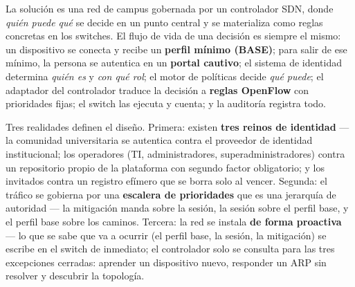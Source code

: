\documentclass[11pt,a4paper]{article}
\begin{document}
La solución es una red de campus gobernada por un controlador SDN, donde \emph{quién puede qué} se decide en un punto central y se materializa como reglas concretas en los switches. El flujo de vida de una decisión es siempre el mismo: un dispositivo se conecta y recibe un \textbf{perfil mínimo (BASE)}; para salir de ese mínimo, la persona se autentica en un \textbf{portal cautivo}; el sistema de identidad determina \emph{quién es} y \emph{con qué rol}; el motor de políticas decide \emph{qué puede}; el adaptador del controlador traduce la decisión a \textbf{reglas OpenFlow} con prioridades fijas; el switch las ejecuta y cuenta; y la auditoría registra todo.

Tres realidades definen el diseño. Primera: existen \textbf{tres reinos de identidad} --- la comunidad universitaria se autentica contra el proveedor de identidad institucional; los operadores (TI, administradores, superadministradores) contra un repositorio propio de la plataforma con segundo factor obligatorio; y los invitados contra un registro efímero que se borra solo al vencer. Segunda: el tráfico se gobierna por una \textbf{escalera de prioridades} que es una jerarquía de autoridad --- la mitigación manda sobre la sesión, la sesión sobre el perfil base, y el perfil base sobre los caminos. Tercera: la red se instala \textbf{de forma proactiva} --- lo que se sabe que va a ocurrir (el perfil base, la sesión, la mitigación) se escribe en el switch de inmediato; el controlador solo se consulta para las tres excepciones cerradas: aprender un dispositivo nuevo, responder un ARP sin resolver y descubrir la topología.
\end{document}
